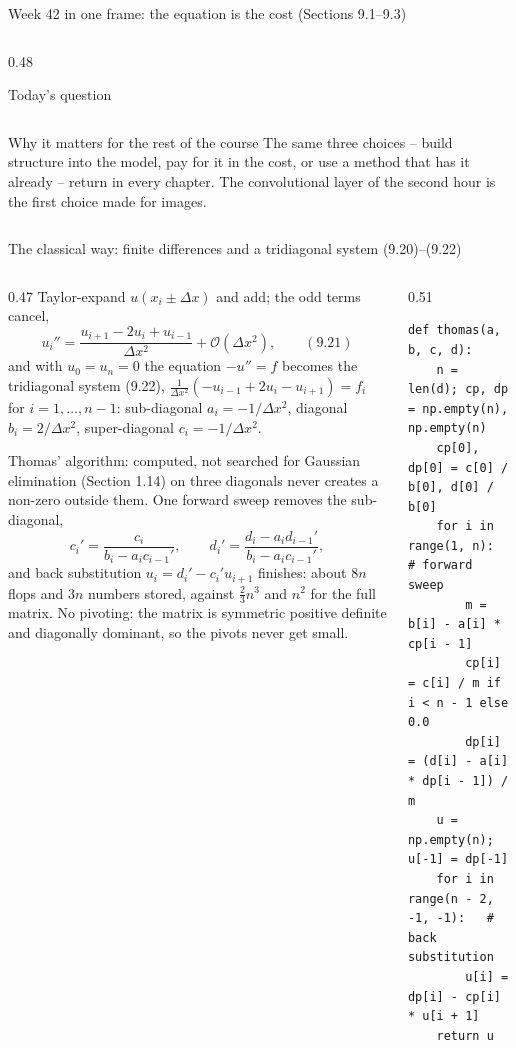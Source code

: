 \documentclass[10pt,aspectratio=169]{beamer}
\begin{document}
\begin{frame}{Week 42 in one frame: the equation is the cost (Sections 9.1--9.3)}
\begin{columns}[T]
\begin{column}{0.48\textwidth}
\begin{block}{Today's question}
\begin{center}
\begin{tabular}{@{}lll@{}}
\bottomrule
\end{tabular}
\end{center}
\end{block}
\begin{block}{Why it matters for the rest of the course}
\scriptsize
The same three choices -- build structure into the model, pay for it in the
cost, or use a method that has it already -- return in every chapter.  The
convolutional layer of the second hour is the first choice made for
images.
\end{block}
\end{column}
\end{columns}
\end{frame}

\begin{frame}[fragile]{The classical way: finite differences and a tridiagonal system (9.20)--(9.22)}
\begin{columns}[T]
\begin{column}{0.47\textwidth}
\scriptsize
Taylor-expand $u(x_i\pm\Delta x)$ and add; the odd terms cancel,
\[
  u_i''=\frac{u_{i+1}-2u_i+u_{i-1}}{\Delta x^{2}}+\mathcal{O}(\Delta x^{2}),
  \qquad(9.21)
\]
and with $u_0=u_n=0$ the equation $-u''=f$ becomes the tridiagonal system
(9.22), $\tfrac{1}{\Delta x^{2}}(-u_{i-1}+2u_i-u_{i+1})=f_i$ for
$i=1,\dots,n-1$: sub-diagonal $a_i=-1/\Delta x^{2}$, diagonal
$b_i=2/\Delta x^{2}$, super-diagonal $c_i=-1/\Delta x^{2}$.
\begin{block}{Thomas' algorithm: computed, not searched for}
\scriptsize
Gaussian elimination (Section 1.14) on three diagonals never creates a
non-zero outside them.  One forward sweep removes the sub-diagonal,
\[
  c_i'=\frac{c_i}{b_i-a_ic_{i-1}'},\qquad
  d_i'=\frac{d_i-a_id_{i-1}'}{b_i-a_ic_{i-1}'},
\]
and back substitution $u_i=d_i'-c_i'u_{i+1}$ finishes: about $8n$ flops
and $3n$ numbers stored, against $\tfrac{2}{3}n^{3}$ and $n^{2}$ for the
full matrix.  No pivoting: the matrix is symmetric positive definite and
diagonally dominant, so the pivots never get small.
\end{block}
\end{column}
\begin{column}{0.51\textwidth}
\begin{lstlisting}
def thomas(a, b, c, d):
    n = len(d); cp, dp = np.empty(n), np.empty(n)
    cp[0], dp[0] = c[0] / b[0], d[0] / b[0]
    for i in range(1, n):            # forward sweep
        m = b[i] - a[i] * cp[i - 1]
        cp[i] = c[i] / m if i < n - 1 else 0.0
        dp[i] = (d[i] - a[i] * dp[i - 1]) / m
    u = np.empty(n); u[-1] = dp[-1]
    for i in range(n - 2, -1, -1):   # back substitution
        u[i] = dp[i] - cp[i] * u[i + 1]
    return u


\end{lstlisting}
\end{column}
\end{columns}
\end{frame}
\end{document}

